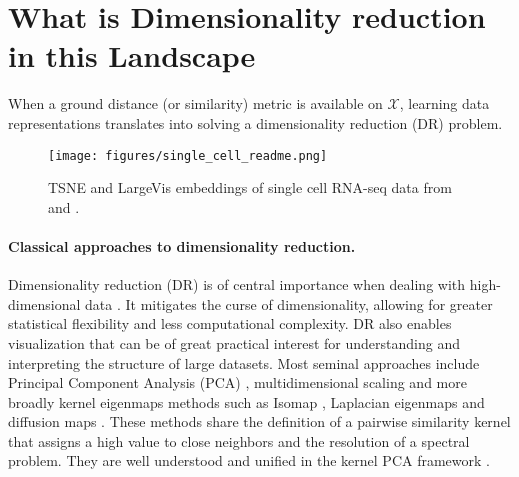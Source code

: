 \section{What is Dimensionality reduction in this Landscape}

When a ground distance (or similarity) metric is available on $\mathcal{X}$, learning data representations translates into solving a dimensionality reduction (DR) problem.

\begin{figure}[t]
    \centering
    \texttt{[image: figures/single\_cell\_readme.png]}
    \caption{TSNE and LargeVis embeddings of single cell RNA-seq data from \citep{macosko2015highly} and \citep{zheng2017massively}.
    }
    \label{fig:intro_fig}
\end{figure}

\paragraph{Classical approaches to dimensionality reduction.}
Dimensionality reduction (DR) is of central importance when dealing with high-dimensional data \citep{donoho2000high}. It mitigates the curse of dimensionality, allowing for greater statistical flexibility and less computational complexity. DR also enables visualization that can be of great practical interest for understanding and interpreting the structure of large datasets.
Most seminal approaches include Principal Component Analysis (PCA) \citep{pearson1901liii},  multidimensional scaling \citep{kruskal1978multidimensional} and more broadly kernel eigenmaps methods such as Isomap \citep{balasubramanian2002isomap}, Laplacian eigenmaps \citep{belkin2003laplacian} and diffusion maps \citep{coifman2006diffusion}. These methods share the definition of a pairwise similarity kernel that assigns a high value to close neighbors and the resolution of a spectral problem. They are well understood and unified in the kernel PCA framework \citep{ham2004kernel}.

